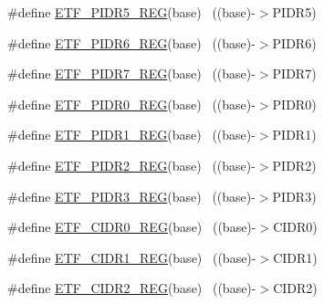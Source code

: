 \begin{DoxyCompactItemize}
\item 
\#define \hyperlink{group___e_t_f___register___accessor___macros_gad07bd35743dda4c65ffc83da3c02c1c8}{E\+T\+F\+\_\+\+P\+I\+D\+R5\+\_\+\+R\+EG}(base)                                        ~((base)-\/$>$P\+I\+D\+R5)
\item 
\#define \hyperlink{group___e_t_f___register___accessor___macros_gadb758d0aa38d644a432e5dd9978d212f}{E\+T\+F\+\_\+\+P\+I\+D\+R6\+\_\+\+R\+EG}(base)                                        ~((base)-\/$>$P\+I\+D\+R6)
\item 
\#define \hyperlink{group___e_t_f___register___accessor___macros_ga6091662320901cb89249b5e681300fd9}{E\+T\+F\+\_\+\+P\+I\+D\+R7\+\_\+\+R\+EG}(base)                                        ~((base)-\/$>$P\+I\+D\+R7)
\item 
\#define \hyperlink{group___e_t_f___register___accessor___macros_ga9e41167372f1530189363d41dbbfd95f}{E\+T\+F\+\_\+\+P\+I\+D\+R0\+\_\+\+R\+EG}(base)                                        ~((base)-\/$>$P\+I\+D\+R0)
\item 
\#define \hyperlink{group___e_t_f___register___accessor___macros_ga8b5d8e019a3a93b4a7e281b2ac481f3a}{E\+T\+F\+\_\+\+P\+I\+D\+R1\+\_\+\+R\+EG}(base)                                        ~((base)-\/$>$P\+I\+D\+R1)
\item 
\#define \hyperlink{group___e_t_f___register___accessor___macros_ga4119e645336b38b14c438854463865ab}{E\+T\+F\+\_\+\+P\+I\+D\+R2\+\_\+\+R\+EG}(base)                                        ~((base)-\/$>$P\+I\+D\+R2)
\item 
\#define \hyperlink{group___e_t_f___register___accessor___macros_ga6d9e5ced04cbea1843586e45cc8ea979}{E\+T\+F\+\_\+\+P\+I\+D\+R3\+\_\+\+R\+EG}(base)                                        ~((base)-\/$>$P\+I\+D\+R3)
\item 
\#define \hyperlink{group___e_t_f___register___accessor___macros_gab4e786e2f33bbea0b33fd3250cdb2499}{E\+T\+F\+\_\+\+C\+I\+D\+R0\+\_\+\+R\+EG}(base)                                        ~((base)-\/$>$C\+I\+D\+R0)
\item 
\#define \hyperlink{group___e_t_f___register___accessor___macros_gaf70f578ef4ae9dc6d0d1e27c3b57d0f2}{E\+T\+F\+\_\+\+C\+I\+D\+R1\+\_\+\+R\+EG}(base)                                        ~((base)-\/$>$C\+I\+D\+R1)
\item 
\#define \hyperlink{group___e_t_f___register___accessor___macros_gacbbd3a362f90d06779e066903034ea6f}{E\+T\+F\+\_\+\+C\+I\+D\+R2\+\_\+\+R\+EG}(base)                                        ~((base)-\/$>$C\+I\+D\+R2)

\end{DoxyCompactItemize}
